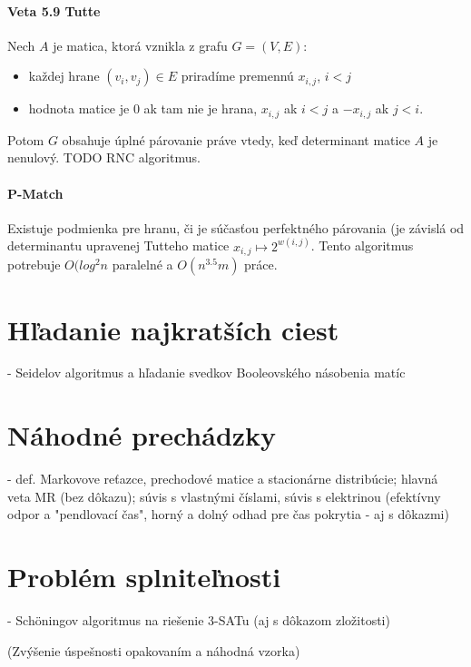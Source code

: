 \documentclass[12pt,a4paper]{article}
\begin{document}
\paragraph{Veta 5.9 Tutte} Nech $A$ je matica, ktorá vznikla z grafu $G = (V,E)$: 
\begin{itemize} 
  \item každej hrane $(v_i, v_j) \in E$ priradíme premennú $x_{i,j}$, $i < j$
  \item hodnota matice je 0 ak tam nie je hrana, $x_{i,j}$ ak $i < j$ a $-x_{i,j}$ ak $j < i$. 
\end{itemize} 
Potom $G$ obsahuje úplné párovanie práve vtedy, keď determinant matice $A$ je nenulový. 
TODO RNC algoritmus. 

\paragraph{P-Match} Existuje podmienka pre hranu, či je súčasťou perfektného párovania (je závislá od determinantu upravenej Tutteho matice $x_{i,j} \mapsto 2^{w(i,j)}$. Tento algoritmus potrebuje $O(log^2n$ paralelné a $O(n^{3.5}m)$ práce. 

\section{Hľadanie najkratších ciest}
 - Seidelov algoritmus a hľadanie svedkov Booleovského násobenia matíc
 

\section{Náhodné prechádzky}
 - def. Markovove reťazce, prechodové matice a stacionárne distribúcie; hlavná veta MR (bez dôkazu); súvis s vlastnými číslami, súvis s elektrinou (efektívny odpor a "pendlovací čas", horný a dolný odhad pre čas pokrytia - aj s dôkazmi)
 

\section{Problém splniteľnosti}
 - Schöningov algoritmus na riešenie 3-SATu (aj s dôkazom zložitosti)
 
(Zvýšenie úspešnosti opakovaním a náhodná vzorka) 
\end{document}
